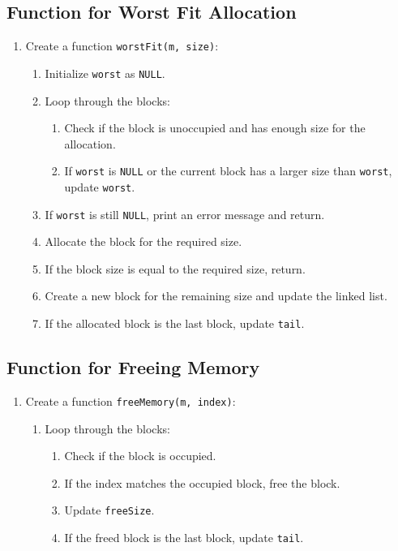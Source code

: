\subsection{Function for Worst Fit Allocation}
\begin{enumerate}[label=\arabic*.,left=0pt]
  \item Create a function \texttt{worstFit(m, size)}:
        \begin{enumerate}[label=2.\arabic*.,left=0pt]
          \item Initialize \texttt{worst} as \texttt{NULL}.
          \item Loop through the blocks:
                \begin{enumerate}[label=2.2.\arabic*.,left=0pt]
                  \item Check if the block is unoccupied and has enough size for the allocation.
                  \item If \texttt{worst} is \texttt{NULL} or the current block has a larger size than \texttt{worst}, update \texttt{worst}.
                \end{enumerate}
          \item If \texttt{worst} is still \texttt{NULL}, print an error message and return.
          \item Allocate the block for the required size.
          \item If the block size is equal to the required size, return.
          \item Create a new block for the remaining size and update the linked list.
          \item If the allocated block is the last block, update \texttt{tail}.
        \end{enumerate}
\end{enumerate}

\subsection{Function for Freeing Memory}
\begin{enumerate}[label=\arabic*.,left=0pt]
  \item Create a function \texttt{freeMemory(m, index)}:
        \begin{enumerate}[label=2.\arabic*.,left=0pt]
          \item Loop through the blocks:
                \begin{enumerate}[label=2.2.\arabic*.,left=0pt]
                  \item Check if the block is occupied.
                  \item If the index matches the occupied block, free the block.
                  \item Update \texttt{freeSize}.
                  \item If the freed block is the last block, update \texttt{tail}.
                \end{enumerate}
        \end{enumerate}
\end{enumerate}

